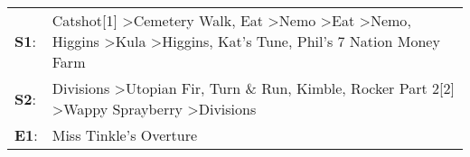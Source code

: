 \begin{supertabular}{p{0.03\textwidth}p{0.92\textwidth}}
 \textbf{S1}:  &  Catshot[1]\textsuperscript{} \textgreater \enspace Cemetery Walk\textsuperscript{}, \enspace Eat\textsuperscript{} \textgreater \enspace Nemo\textsuperscript{} \textgreater \enspace Eat\textsuperscript{} \textgreater \enspace Nemo\textsuperscript{}, \enspace Higgins\textsuperscript{} \textgreater \enspace Kula\textsuperscript{} \textgreater \enspace Higgins\textsuperscript{}, \enspace Kat's Tune\textsuperscript{}, \enspace Phil's 7 Nation Money Farm\textsuperscript{}  \enspace  \\
 \textbf{S2}:  &                                                                                                                                                                       Divisions\textsuperscript{} \textgreater \enspace Utopian Fir\textsuperscript{}, \enspace Turn \& Run\textsuperscript{}, \enspace Kimble\textsuperscript{}, \enspace Rocker Part 2[2]\textsuperscript{} \textgreater \enspace Wappy Sprayberry\textsuperscript{} \textgreater \enspace Divisions\textsuperscript{}  \enspace  \\
 \textbf{E1}:  &                                                                                                                                                                                                                                                                                                                                                                                                                                                 Miss Tinkle's Overture\textsuperscript{}  \enspace  \\
\end{supertabular}
